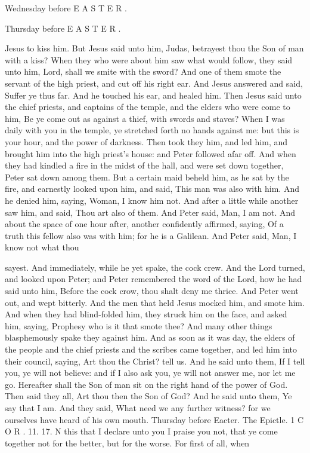 Wednesday before E A S T E R .

Thursday before E A S T E R .

Jesus to kiss him. But Jesus said unto him, Judas, betrayest thou the Son of man with a kiss? When they who were about him saw what would follow, they said unto him, Lord, shall we smite with the sword? And one of them smote the servant of the high priest, and cut off his right ear. And Jesus answered and said, Suffer ye thus far. And he touched his ear, and healed him. Then Jesus said unto the chief priests, and captains of the temple, and the elders who were come to him, Be ye come out as against a thief, with swords and staves? When I was daily with you in the temple, ye stretched forth no hands against me: but this is your hour, and the power of darkness. Then took they him, and led him, and brought him into the high priest’s house: and Peter followed afar off. And when they had kindled a fire in the midst of the hall, and were set down together, Peter sat down among them. But a certain maid beheld him, as he sat by the fire, and earnestly looked upon him, and said, This man was also with him. And he denied him, saying, Woman, I know him not. And after a little while another saw him, and said, Thou art also of them. And Peter said, Man, I am not. And about the space of one hour after, another confidently affirmed, saying, Of a truth this fellow also was with him; for he is a Galilean. And Peter said, Man, I know not what thou

sayest. And immediately, while he yet spake, the cock crew. And the Lord turned, and looked upon Peter; and Peter remembered the word of the Lord, how he had said unto him, Before the cock crow, thou shalt deny me thrice. And Peter went out, and wept bitterly. And the men that held Jesus mocked him, and smote him. And when they had blind-folded him, they struck him on the face, and asked him, saying, Prophesy who is it that smote thee? And many other things blasphemously spake they against him. And as soon as it was day, the elders of the people and the chief priests and the scribes came together, and led him into their council, saying, Art thou the Christ? tell us. And he said unto them, If I tell you, ye will not believe: and if I also ask you, ye will not answer me, nor let me go. Hereafter shall the Son of man sit on the right hand of the power of God. Then said they all, Art thou then the Son of God? And he said unto them, Ye say that I am. And they said, What need we any further witness? for we ourselves have heard of his own mouth. Thursday before Eacter. The Epictle. 1 C O R . 11. 17. N this that I declare unto you I praise you not, that ye come together not for the better, but for the worse. For first of all, when

